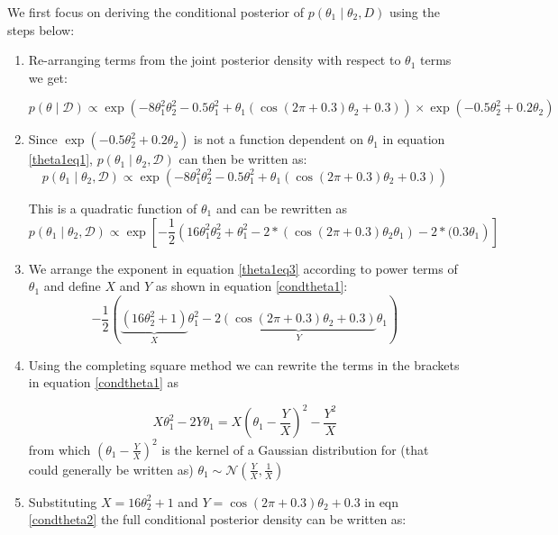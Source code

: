 \documentclass[12pt]{article}
\begin{document}
We first focus on deriving the conditional posterior of  \(p(\theta_1 \mid \theta_2, D)\) using the steps below:

\begin{enumerate}
\item Re-arranging terms from the joint posterior density with respect to $\theta_1$ terms we get:

\begin{equation}\label{theta1eq1}
p(\theta \mid \mathcal{D}) \propto \exp \left( -8\theta_1^2\theta_2^2 - 0.5\theta_1^2 + \theta_1(\cos(2\pi + 0.3)\theta_2 + 0.3) \right) \times \exp \left( -0.5\theta_2^2 + 0.2\theta_2 \right)  
\end{equation} 
\item Since  $\exp \left( -0.5\theta_2^2 + 0.2\theta_2 \right)$  is not a function dependent on $\theta_1$ in equation  \ref{theta1eq1}, $p(\theta_1 \mid \theta_2 ,\mathcal{D}) $ can then be written as:
 \begin{equation}\label{theta1eq2}
p(\theta_1 \mid \theta_2 ,\mathcal{D}) \propto \exp \left( -8\theta_1^2\theta_2^2 - 0.5\theta_1^2 + \theta_1(\cos(2\pi + 0.3)\theta_2 + 0.3) \right)
\end{equation} 

This is a quadratic function of $\theta_1$ and can be rewritten as   \begin{equation}\label{theta1eq3}
p(\theta_1 \mid \theta_2 ,\mathcal{D}) \propto \exp\left[- \frac{1}{2}\left( 16\theta_1^2\theta_2^2 + \theta_1^2 - 2*(\cos(2\pi + 0.3)\theta_2 \theta_1) - 2*(0.3\theta_1 \right)\right]
\end{equation} 

\item We arrange the exponent in equation \ref{theta1eq3} according to power terms of $\theta_1$ and define $X$ and $Y$ as shown in equation \ref{condtheta1}:
\begin{equation}\label{condtheta1}
-\frac{1}{2} \left( \underbrace{(16\theta_2^2 + 1)}_{X}\theta_1^2 - 2\underbrace{\left(\cos(2\pi + 0.3)\theta_2 + 0.3\right)}_{Y}\theta_1 \right)
\end{equation}

\item Using the completing square method we can rewrite the terms in the brackets in equation \ref{condtheta1} as 

\begin{equation}\label{condtheta2}
     X\theta_1^2 - 2Y\theta_1 = X\left(\theta_1 - \frac{Y}{X}\right)^2 - \frac{Y^2}{X}
\end{equation} from which $\left(\theta_1 - \frac{Y}{X}\right)^2$ is the kernel of a Gaussian distribution for (that could generally be written as)  $\theta_1 \sim \mathcal{N} \left(\frac{Y}{X}, \frac{1}{X} \right)$
\item Substituting \( X = 16\theta_2^2 + 1 \) and \( Y = \cos(2\pi + 0.3)\theta_2 + 0.3 \) in eqn \ref{condtheta2} the full conditional posterior density  can be written as:


\end{enumerate}
\end{document}
